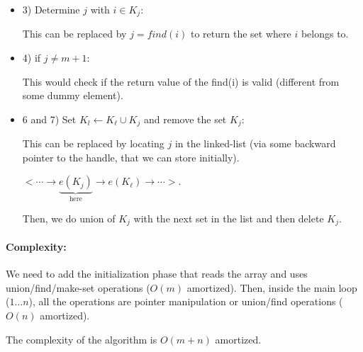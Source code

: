\documentclass[a4paper]{article}
\begin{document}
\begin{itemize}
\item 3) Determine $j$ with $i \in K_j$:

This can be replaced by $j = find(i)$ to return the set where $i$ belongs to.

\item 4) if $j \neq m+1$:

This would check if the return value of the find(i) is valid (different from some dummy element).

\item 6 and 7) Set $K_l \gets K_\ell \cup K_j$ and remove the set $K_j$:

This can be replaced by locating $j$ in the linked-list (via some backward pointer to the handle, that we can store initially).

$<\cdots \rightarrow \underbrace{e(K_j)}_\text{here} \rightarrow e(K_\ell) \rightarrow \cdots>$.

Then, we do union of $K_j$ with the next set in the list and then delete $K_j$.

\end{itemize}

\paragraph{Complexity: } We need to add the initialization phase that reads the array and uses union/find/make-set operations ($O(m)$ amortized).
Then, inside the main loop ($1 \ldots n$), all the operations are pointer manipulation or union/find operations ($O(n)$ amortized).

The complexity of the algorithm is $O(m+n)$ amortized. 
\end{document}
